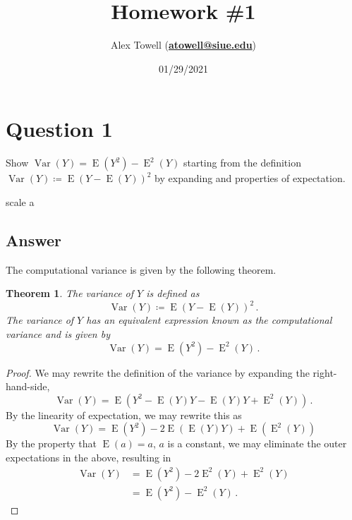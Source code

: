 \documentclass[10pt]{fphw}
\title{Homework \#1} %
\author{Alex Towell (\href{mailto:atowell@siue.edu}{\bfseries{atowell@siue.edu}})}
\date{01/29/2021} %
\institute{Southern Illinois University-Edwardsville}
\newtheorem{theorem}{Theorem}
\newcommand{\var}{\operatorname{Var}}
\newcommand{\expect}{\operatorname{E}}
\begin{document}
\maketitle %
\section*{Question 1}
\begin{problem}
Show $\var(Y) = \expect(Y^2) - \expect^2(Y)$ starting from the definition $\var(Y) \coloneqq \expect(Y-\expect(Y))^2$ by expanding and properties of expectation.
\end{problem}scale a

\subsection*{Answer}
The computational variance is given by the following theorem.
\begin{theorem}
The variance of $Y$ is defined as
\begin{equation}
    \var(Y) \coloneqq \expect(Y-\expect(Y))^2\,.
\end{equation}
The variance of $Y$ has an equivalent expression known as the \emph{computational} variance and is given by
\begin{equation}
    \var(Y) = \expect(Y^2) - \expect^2(Y)\,.
\end{equation}
\end{theorem}
\begin{proof}
We may rewrite the definition of the variance by expanding the right-hand-side,
\begin{equation}
	\var(Y) = \expect(Y^2 - \expect(Y) Y - \expect(Y) Y + \expect^2(Y))\,.
\end{equation}
By the linearity of expectation, we may rewrite this as
\begin{equation}
	\var(Y) = \expect(Y^2) - 2 \expect(\expect(Y) Y) + \expect(\expect^2(Y))
\end{equation}
By the property that $\expect(a) = a$, $a$ is a constant, we may eliminate the outer expectations in the above, resulting in
\begin{equation*}
\begin{split}
	\var(Y) &= \expect(Y^2) - 2 \expect^2(Y) + \expect^2(Y)\\
		    &= \expect(Y^2) - \expect^2(Y)\,.
\end{split}		    
\end{equation*}
\end{proof}
\end{document}
